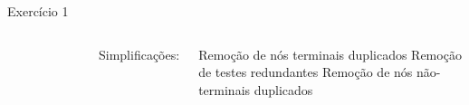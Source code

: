 \expandafter\documentclass\expandafter[table, usenames, svgnames, dvipsnames,14pt, \classopts]{beamer}
\begin{document}
\begin{frame}{Exercício 1}
\begin{columns}[c]
\begin{figure}
            \end{figure}

            
            {\small
                Simplificações:
                {\scriptsize
                    \begin{outline}
                        \1[\textbf{C1}.] Remoção de nós terminais duplicados
                        \1[\textbf{C2}.] Remoção de testes redundantes
                        \1[\textbf{C3}.] Remoção de nós não-terminais duplicados
                    \end{outline}
                }
            }
    
    \end{columns}
    
\end{frame}
\end{document}
